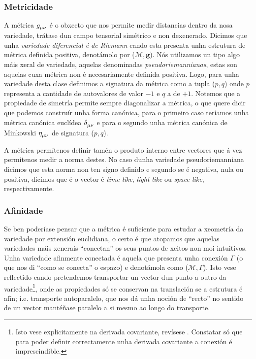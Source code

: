 \subsubsection{Metricidade}
A métrica $g\indices{_\mu_\nu}$ é o obxecto que nos permite medir distancias dentro da nosa variedade, trátase dun campo tensorial simétrico e non dexenerado. Dicimos que unha \textit{variedade diferencial é de Riemann} cando esta presenta unha estrutura de métrica definida positiva, denotámolo por ($\mathcal{M},\textbf{g}$). Nós utilizamos un tipo algo máis xeral de variedade, aquelas denominadas \textit{pseudoriemannianas}, estas son aquelas cuxa métrica non é necesariamente definida positiva. Logo, para unha variedade desta clase definimos a signatura da métrica como a tupla ($p,q$) onde $p$ representa a cantidade de autovalores de valor $-1$ e $q$ a de $+1$. Notemos que a propiedade de simetría permite sempre diagonalizar a métrica, o que quere dicir que podemos construír unha forma canónica, para o primeiro caso teríamos unha métrica canónica euclídea $\delta\indices{_\mu_\nu}$ e para o segundo unha métrica canónica de Minkowski $\eta\indices{_\mu_\nu}$ de signatura ($p,q$).

A métrica permítenos definir tamén o produto interno entre vectores que á vez permítenos medir a norma destes. No caso dunha variedade pseudoriemanniana dicimos que esta norma non ten signo definido e segundo se é negativa, nula ou positiva, dicimos que é o vector é \textit{time-like}, \textit{light-like} ou \textit{space-like}, respectivamente.

\subsubsection{Afinidade}
Se ben poderíase pensar que a métrica é suficiente para estudar a xeometría da variedade por extensión euclidiana, o certo é que atopamos que aquelas variedades máis xenerais ``conectan'' os seus puntos de xeitos non moi intuitivos. Unha variedade afinmente conectada é aquela que presenta unha conexión $\Gamma$ (o que nos di ``como se conecta'' o espazo) e denotámola como ($\mathcal{M},\Gamma$). Isto vese reflectido cando pretendemos transportar un vector dun punto a outro da variedade\footnote{Isto vese explicitamente na derivada covariante, revísese \cite{notasclase,doCarmo,lovelock-1989}. Constatar só que para poder definir correctamente unha derivada covariante a conexión é imprescindible.}, onde as propiedades só se conservan na translación se a estrutura é afín; i.e. transporte autoparalelo, que nos dá unha noción de ``recto'' no sentido de un vector mantéñase paralelo a si mesmo ao longo do transporte.

